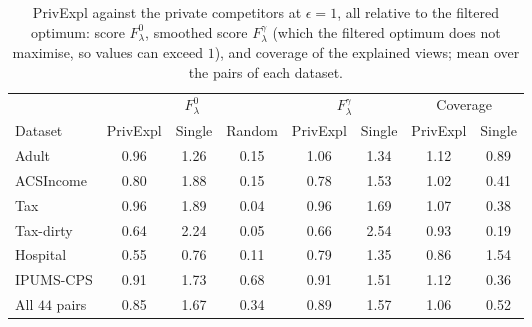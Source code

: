 \begin{table}[t]
\centering
\footnotesize
\caption{\textsf{PrivExpl} against the private competitors at $\epsilon=1$, all relative to the filtered optimum: score $F^0_\lambda$, smoothed score $F^\gamma_\lambda$ (which the filtered optimum does not maximise, so values can exceed $1$), and coverage of the explained views; mean over the pairs of each dataset.}
\label{tab:competitors}
\setlength{\tabcolsep}{2.5pt}
\begin{tabular}{@{}lccccccc@{}}
\toprule
 & \multicolumn{3}{c}{$F^0_\lambda$} & \multicolumn{2}{c}{$F^\gamma_\lambda$} & \multicolumn{2}{c}{Coverage} \\
\cmidrule(lr){2-4}\cmidrule(lr){5-6}\cmidrule(l){7-8}
Dataset & PrivExpl & Single & Random & PrivExpl & Single & PrivExpl & Single \\
\midrule
Adult      & 0.96 & 1.26 & 0.15 & 1.06 & 1.34 & 1.12 & 0.89 \\
ACSIncome  & 0.80 & 1.88 & 0.15 & 0.78 & 1.53 & 1.02 & 0.41 \\
Tax        & 0.96 & 1.89 & 0.04 & 0.96 & 1.69 & 1.07 & 0.38 \\
Tax-dirty  & 0.64 & 2.24 & 0.05 & 0.66 & 2.54 & 0.93 & 0.19 \\
Hospital   & 0.55 & 0.76 & 0.11 & 0.79 & 1.35 & 0.86 & 1.54 \\
IPUMS-CPS  & 0.91 & 1.73 & 0.68 & 0.91 & 1.51 & 1.12 & 0.36 \\
\midrule
All $44$ pairs & 0.85 & 1.67 & 0.34 & 0.89 & 1.57 & 1.06 & 0.52 \\
\bottomrule
\end{tabular}
\end{table}

